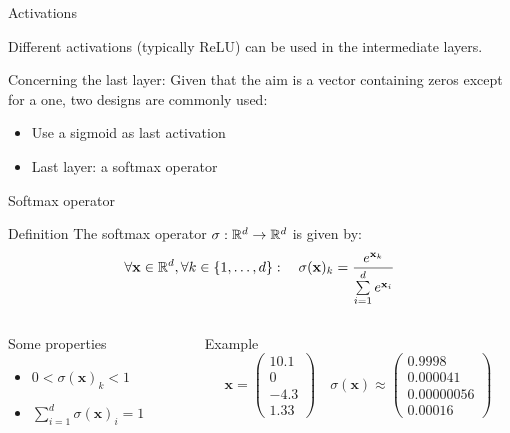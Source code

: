 \documentclass[xcolor=pdftex,dvipsnames,table,mathserif]{beamer}
\newcommand{\myvec}[1]{\ensuremath{\begin{pmatrix}#1\end{pmatrix}}}
\begin{document}
\begin{frame}{Activations}

  Different activations (typically ReLU) can be used in the intermediate layers.
  \vspace{1em}

  Concerning the last layer: Given that the aim is a vector containing zeros except for a one, two designs are commonly used:

  \begin{itemize}
  \item Use a sigmoid as last activation
  \item Last layer: a softmax operator
  \end{itemize}

\end{frame}

\begin{frame}{Softmax operator}

  \begin{block}{Definition}
    The softmax operator $\sigma: \mathbb{R}^d \rightarrow \mathbb{R}^d$ is given by:
    \[
    \forall \mathbf{x}  \in \mathbb{R}^d, \forall k \in \{1, \ldots, d\}:\quad \sigma(\mathbf{x})_k = \frac{e^{\mathbf{x}_k}}{\sum\limits_{i=1}^d e^{\mathbf{x}_i}}
    \]
  \end{block}

  \pause

  \begin{columns}
    \begin{column}{.3\textwidth}
      \begin{block}{Some properties}
        \begin{itemize}
        \item $0 < \sigma(\mathbf{x})_k < 1$
        \item $\sum\limits_{i=1}^d \sigma(\mathbf{x})_i = 1$
        \end{itemize}
      \end{block}

    \end{column}

    \pause

    \begin{column}{.7\textwidth}

      \begin{block}{Example}
        \[
        \mathbf{x} = \myvec{10.1\\0\\-4.3\\1.33}  \quad \sigma(\mathbf{x}) \approx \myvec{0.9998\\0.000041\\0.00000056\\0.00016}
        \]

      \end{block}



    \end{column}
  \end{columns}



\end{frame}
\end{document}
